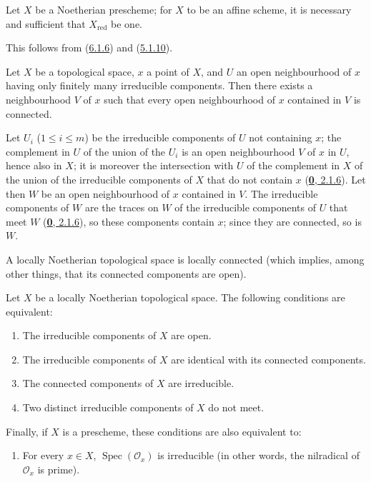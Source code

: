 \begin{corollary}[6.1.7]
\label{I.6.1.7}
Let $X$ be a Noetherian prescheme; for $X$ to be an affine scheme, it is
necessary and sufficient that $X_{\mathrm{red}}$ be one.
\end{corollary}

This follows from (\hyperref[I.6.1.6]{6.1.6}) and
(\hyperref[I.5.1.10]{5.1.10}).

\begin{lemma}[6.1.8]
\label{I.6.1.8}
Let $X$ be a topological space, $x$ a point of $X$, and $U$ an open
neighbourhood of $x$ having only finitely many irreducible components. Then
there exists a neighbourhood $V$ of $x$ such that every open neighbourhood of
$x$ contained in $V$ is connected.
\end{lemma}

Let $U_i$ ($1\leq i\leq m$) be the irreducible components of $U$ not
containing $x$; the complement in $U$ of the union of the $U_i$ is an
open neighbourhood $V$ of $x$ in $U$, hence also in $X$; it is moreover
the intersection with $U$ of the complement in $X$ of the union of the
irreducible components of $X$ that do not contain $x$
(\hyperref[0.2.1.6]{\textbf{0}, 2.1.6}). Let then $W$ be an open neighbourhood of
$x$ contained in $V$. The irreducible components of $W$ are the traces on $W$
of the irreducible components of $U$ that meet $W$
(\hyperref[0.2.1.6]{\textbf{0}, 2.1.6}), so these components contain $x$; since
they are connected, so is $W$.

\begin{corollary}[6.1.9]
\label{I.6.1.9}
A locally Noetherian topological space is locally connected (which
implies, among other things, that its connected components are open).
\end{corollary}

\begin{proposition}[6.1.10]
\label{I.6.1.10}
Let $X$ be a locally Noetherian topological space. The following conditions
are equivalent:
\begin{enumerate}
  \item[\textup{a)}] The irreducible components of $X$ are open.
  \item[\textup{b)}] The irreducible components of $X$ are identical with its
    connected components.
  \item[\textup{c)}] The connected components of $X$ are irreducible.
  \item[\textup{d)}] Two distinct irreducible components of $X$ do not
    meet.
\end{enumerate}

Finally, if $X$ is a prescheme, these conditions are also equivalent to:
\begin{enumerate}
  \item[\textup{e)}] For every $x\in X$, $\operatorname{Spec}(\mathscr{O}_x)$ is
    irreducible (in other words, the nilradical of $\mathscr{O}_x$ is prime).
\end{enumerate}
\end{proposition}

